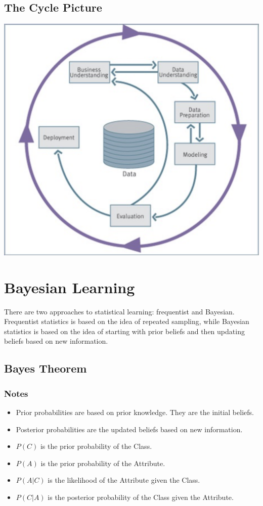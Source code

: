 \documentclass[10pt]{report}
\begin{document}
\section{The Cycle Picture}
\includegraphics[width=\textwidth]{cycle.png}

\chapter{Bayesian Learning}
There are two approaches to statistical learning: frequentist and Bayesian. Frequentist statistics is based on the idea of repeated sampling, while Bayesian statistics is based on the idea of starting with prior beliefs and then updating beliefs based on new information.
\section{Bayes Theorem}
\subsection{Notes}
\begin{itemize}
  \item Prior probabilities are based on prior knowledge. They are the initial beliefs.
    \item Posterior probabilities are the updated beliefs based on new information.
  \item $P(C)$ is the prior probability of the Class.
  \item $P(A)$ is the prior probability of the Attribute.
  \item $P(A|C)$ is the likelihood of the Attribute given the Class.
  \item $P(C|A)$ is the posterior probability of the Class given the Attribute.
\end{itemize}
\end{document}
